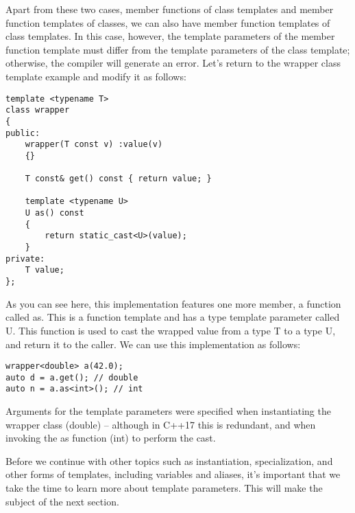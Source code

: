 Apart from these two cases, member functions of class templates and member function templates of classes, we can also have member function templates of class templates. In this case, however, the template parameters of the member function template must differ from the template parameters of the class template; otherwise, the compiler will generate an error. Let's return to the wrapper class template example and modify it as follows:

\begin{lstlisting}[style=styleCXX]
template <typename T>
class wrapper
{
public:
	wrapper(T const v) :value(v)
	{}
	
	T const& get() const { return value; }
	
	template <typename U>
	U as() const
	{
		return static_cast<U>(value);
	}
private:
	T value;
};
\end{lstlisting}

As you can see here, this implementation features one more member, a function called as. This is a function template and has a type template parameter called U. This function is used to cast the wrapped value from a type T to a type U, and return it to the caller. We can use this implementation as follows:


\begin{lstlisting}[style=styleCXX]
wrapper<double> a(42.0);
auto d = a.get(); // double
auto n = a.as<int>(); // int
\end{lstlisting}

Arguments for the template parameters were specified when instantiating the wrapper class (double) – although in C++17 this is redundant, and when invoking the as function (int) to perform the cast.

Before we continue with other topics such as instantiation, specialization, and other forms of templates, including variables and aliases, it's important that we take the time to learn more about template parameters. This will make the subject of the next section.







